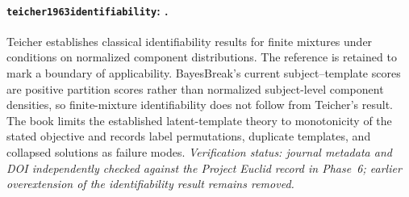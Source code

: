\paragraph{\texttt{teicher1963identifiability}: \citet{teicher1963identifiability}.}
Teicher establishes classical identifiability results for finite mixtures under conditions on normalized component distributions. The reference is retained to mark a boundary of applicability. BayesBreak's current subject--template scores are positive partition scores rather than normalized subject-level component densities, so finite-mixture identifiability does not follow from Teicher's result. The book limits the established latent-template theory to monotonicity of the stated objective and records label permutations, duplicate templates, and collapsed solutions as failure modes. \textit{Verification status: journal metadata and DOI independently checked against the Project Euclid record in Phase~6; earlier overextension of the identifiability result remains removed.}
